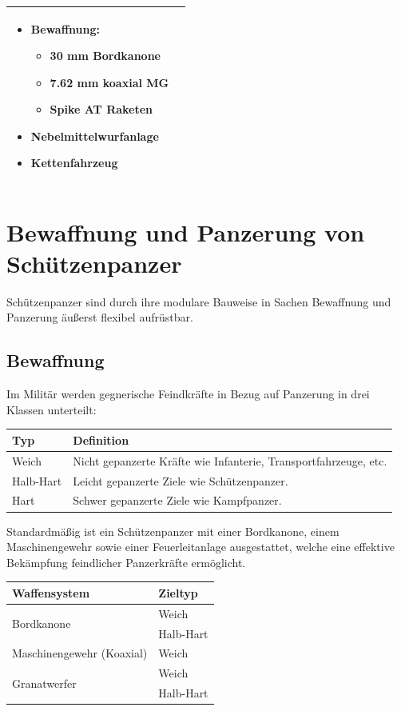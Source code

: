 \begin{longtable}{lc}
\begin{minipage}[t]{0.4\textwidth}
\begin{itemize}
				\item Bewaffnung:
				\begin{itemize}
					\item 30 mm Bordkanone
					\item 7.62 mm koaxial MG
					\item Spike AT Raketen
				\end{itemize}
				\item Nebelmittelwurfanlage
				\item Kettenfahrzeug
			\end{itemize}
		\end{minipage}\\	
		\bottomrule 
	\end{longtable}

\section{Bewaffnung und Panzerung von Schützenpanzer}
Schützenpanzer sind durch ihre modulare Bauweise in Sachen Bewaffnung und Panzerung äußerst flexibel aufrüstbar.

\subsection{Bewaffnung}
	Im Militär werden gegnerische Feindkräfte in Bezug auf Panzerung in drei Klassen unterteilt:
	\begin{longtable}{ll} 
		\toprule
		Typ & Definition\\
		\midrule
		Weich & Nicht gepanzerte Kräfte wie Infanterie, Transportfahrzeuge, etc.\\
		Halb-Hart & Leicht gepanzerte Ziele wie Schützenpanzer.\\
		Hart & Schwer gepanzerte Ziele wie Kampfpanzer.\\
		\bottomrule 
	\end{longtable}

	Standardmäßig ist ein Schützenpanzer mit einer Bordkanone, einem Maschinengewehr sowie einer Feuerleitanlage ausgestattet, welche eine effektive Bekämpfung feindlicher Panzerkräfte ermöglicht.
	\begin{longtable}{ll} 
		\toprule
		Waffensystem & Zieltyp\\
		\midrule
		\multirow{2}{*}{Bordkanone} & Weich\\
		& Halb-Hart\\
		Maschinengewehr (Koaxial) & Weich\\
		\multirow{2}{*}{Granatwerfer} & Weich\\
		& Halb-Hart\\
		\bottomrule 
	\end{longtable}

